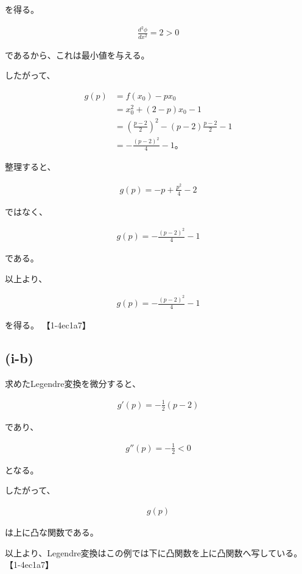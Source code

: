 \documentclass[platex,dvipdfmx,a4paper]{jsarticle}
\begin{document}
を得る。

\begin{align*}
\frac{d^2\phi}{dx^2}=2>0
\end{align*}

であるから、これは最小値を与える。

したがって、

\begin{align*}
g(p)
&=
f(x_0)-px_0 \\
&=
x_0^2+(2-p)x_0-1 \\
&=
\left(\frac{p-2}{2}\right)^2
-(p-2)\frac{p-2}{2}
-1 \\
&=
-\frac{(p-2)^2}{4}-1。
\end{align*}

整理すると、

\begin{align*}
g(p)
=
-p+\frac{p^2}{4}-2
\end{align*}

ではなく、

\begin{align*}
g(p)
=
-\frac{(p-2)^2}{4}-1
\end{align*}

である。

以上より、

\begin{align*}
g(p)
=
-\frac{(p-2)^2}{4}-1
\end{align*}

を得る。 【1-4ec1a7】

\subsection{(i-b)}

求めたLegendre変換を微分すると、

\begin{align*}
g'(p)
=
-\frac12(p-2)
\end{align*}

であり、

\begin{align*}
g''(p)
=
-\frac12
<
0
\end{align*}

となる。

したがって、

\begin{align*}
g(p)
\end{align*}

は上に凸な関数である。

以上より、Legendre変換はこの例では下に凸関数を上に凸関数へ写している。 【1-4ec1a7】
\end{document}
